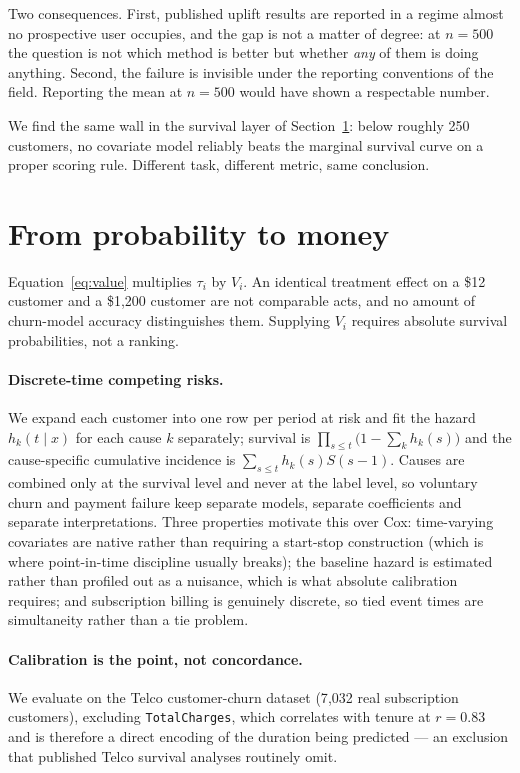 \documentclass[11pt,a4paper]{article}
\newcommand{\CATE}{\tau}
\begin{document}
Two consequences. First, published uplift results are reported in a regime almost no
prospective user occupies, and the gap is not a matter of degree: at $n=500$ the
question is not which method is better but whether \emph{any} of them is doing
anything. Second, the failure is invisible under the reporting conventions of the
field. Reporting the mean at $n=500$ would have shown a respectable number.

We find the same wall in the survival layer of Section~\ref{sec:value}: below
roughly 250 customers, no covariate model reliably beats the marginal survival curve
on a proper scoring rule. Different task, different metric, same conclusion.

\section{From probability to money}
\label{sec:value}

Equation~\eqref{eq:value} multiplies $\CATE_i$ by $V_i$. An identical treatment
effect on a \$12 customer and a \$1{,}200 customer are not comparable acts, and no
amount of churn-model accuracy distinguishes them. Supplying $V_i$ requires absolute
survival probabilities, not a ranking.

\paragraph{Discrete-time competing risks.} We expand each customer into one row per
period at risk and fit the hazard $h_k(t \mid x)$ for each cause $k$ separately;
survival is $\prod_{s \le t}\bigl(1 - \sum_k h_k(s)\bigr)$ and the cause-specific
cumulative incidence is $\sum_{s\le t} h_k(s) S(s-1)$. Causes are combined only at
the survival level and never at the label level, so voluntary churn and payment
failure keep separate models, separate coefficients and separate interpretations.
Three properties motivate this over Cox: time-varying covariates are native rather
than requiring a start-stop construction (which is where point-in-time discipline
usually breaks); the baseline hazard is estimated rather than profiled out as a
nuisance, which is what absolute calibration requires; and subscription billing is
genuinely discrete, so tied event times are simultaneity rather than a tie problem.

\paragraph{Calibration is the point, not concordance.} We evaluate on the Telco
customer-churn dataset \citep{telco} (7{,}032 real subscription customers), excluding
\texttt{TotalCharges}, which correlates with tenure at $r = 0.83$ and is therefore a
direct encoding of the duration being predicted --- an exclusion that published
Telco survival analyses routinely omit.
\end{document}
